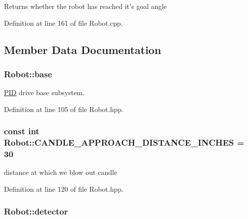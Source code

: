 \begin{DoxyReturn}{Returns}
whether the robot has reached it's goal angle 
\end{DoxyReturn}


Definition at line 161 of file Robot.\-cpp.



\subsection{Member Data Documentation}
\hypertarget{classRobot_adbf538f97c0f9f98337f5171e715badc}{
\subsubsection[{base}]{ Robot\-::base}}\label{classRobot_adbf538f97c0f9f98337f5171e715badc}


\hyperlink{classPID}{P\-I\-D} drive base subsystem. 



Definition at line 105 of file Robot.\-hpp.

\hypertarget{classRobot_a59c0d01f9863b7c1e504b558bd9fae67}{
\subsubsection[{C\-A\-N\-D\-L\-E\-\_\-\-A\-P\-P\-R\-O\-A\-C\-H\-\_\-\-D\-I\-S\-T\-A\-N\-C\-E\-\_\-\-I\-N\-C\-H\-E\-S}]{\setlength{\rightskip}{0pt plus 5cm}const int Robot\-::\-C\-A\-N\-D\-L\-E\-\_\-\-A\-P\-P\-R\-O\-A\-C\-H\-\_\-\-D\-I\-S\-T\-A\-N\-C\-E\-\_\-\-I\-N\-C\-H\-E\-S = 30\hspace{0.3cm}{\ttfamily [static]}}}\label{classRobot_a59c0d01f9863b7c1e504b558bd9fae67}


distance at which we blow out candle 



Definition at line 120 of file Robot.\-hpp.

\hypertarget{classRobot_a19cb4c2ee87b595db9275e6b3d9ca30d}{
\subsubsection[{detector}]{ Robot\-::detector}}\label{classRobot_a19cb4c2ee87b595db9275e6b3d9ca30d}


